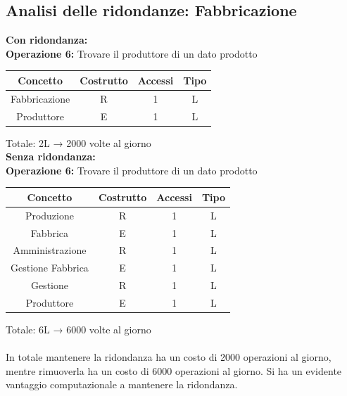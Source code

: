 \documentclass[a4paper,12pt]{report}
\begin{document}
\subsection{Analisi delle ridondanze: Fabbricazione}
\textbf{Con ridondanza:}\\
\textbf{Operazione 6:} Trovare il produttore di un dato prodotto\\
\begin{center}
    \begin{tabular}{ | c   c   c   c | } 
    \hline
	Concetto&Costrutto&Accessi&Tipo\\
	\hline
	Fabbricazione&R&1&L\\
	\hline
    Produttore&E&1&L\\
	\hline
	\end{tabular}
\end{center}
Totale: 2L → 2000 volte al giorno\\
\textbf{Senza ridondanza:}\\
\textbf{Operazione 6:} Trovare il produttore di un dato prodotto\\
\begin{center}
    \begin{tabular}{ | c   c   c   c | } 
    \hline
	Concetto&Costrutto&Accessi&Tipo\\
	\hline
	Produzione&R&1&L\\
	\hline
	Fabbrica&E&1&L\\
	\hline
	Amministrazione&R&1&L\\
	\hline
	Gestione Fabbrica&E&1&L\\
	\hline
	Gestione&R&1&L\\
	\hline
    Produttore&E&1&L\\
	\hline
	\end{tabular}
\end{center}
Totale: 6L → 6000 volte al giorno\\
\\
In totale mantenere la ridondanza ha un costo di 2000 operazioni al giorno, mentre rimuoverla ha un costo di 6000 operazioni al giorno. Si ha un evidente vantaggio computazionale a mantenere la ridondanza.\\
\end{document}
